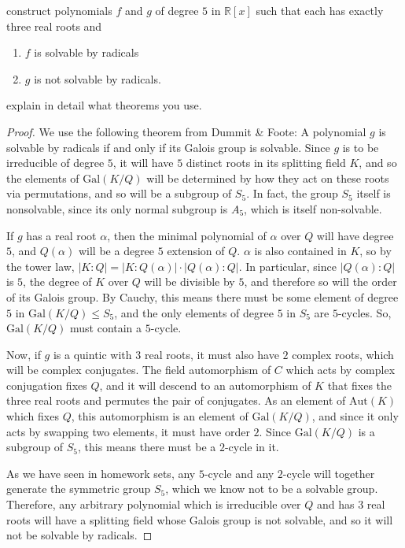 \documentclass[12pt]{article}
\newcommand{\R}{\mathbb{R}}
\theoremstyle{definition}
\newenvironment{problem}[2][Problem]{\begin{trivlist}
\item[\hskip \labelsep {\bfseries #1}\hskip \labelsep {\bfseries #2.}]}{\end{trivlist}}
\begin{document}
\begin{problem}{7}
	construct polynomials $f$ and $g$ of degree $5$ in $\R[x]$ such that each has exactly three real roots and
	\begin{enumerate}[label=(\alph*)]
		\item $f$ is solvable by radicals
		\item $g$ is not solvable by radicals.
	\end{enumerate}
	explain in detail what theorems you use.
	\begin{proof}
		We use the following theorem from Dummit \& Foote: A polynomial $g$ is solvable by radicals if and only if its Galois group is solvable. Since $g$ is to be irreducible of degree $5$, it will have $5$ distinct roots in its splitting field $K$, and so the elements of $\text{Gal}(K/Q)$ will be determined by how they act on these roots via permutations, and so will be a subgroup of $S_5$. In fact, the group $S_5$ itself is nonsolvable, since its only normal subgroup is $A_5$, which is itself non-solvable.
		\par If $g$ has a real root $\alpha$, then the minimal polynomial of $\alpha$ over $Q$ will have degree $5$, and $Q(\alpha)$ will be a degree $5$ extension of $Q$. $\alpha$ is also contained in $K$, so by the tower law, $ \left \lvert { K : Q } \right \lvert = \left \lvert { K : Q(\alpha) } \right \lvert \cdot \left \lvert { Q(\alpha) : Q } \right \lvert $. In particular, since $\left \lvert { Q(\alpha) : Q } \right \lvert $ is $5$, the degree of $K$ over $Q$ will be divisible by $5$, and therefore so will the order of its Galois group. By Cauchy, this means there must be some element of degree $5$ in $\text{Gal}(K/Q) \leq S_5$, and the only elements of degree $5$ in $S_5$ are $5$-cycles. So, $\text{Gal}(K/Q)$ must contain a $5$-cycle.
		\par Now, if $g$ is a quintic with $3$ real roots, it must also have $2$ complex roots, which will be complex conjugates. The field automorphism of $C$ which acts by complex conjugation fixes $Q$, and it will descend to an automorphism of $K$ that fixes the three real roots and permutes the pair of conjugates. As an element of $\text{Aut}(K)$ which fixes $Q$, this automorphism is an element of $\text{Gal}(K/Q)$, and since it only acts by swapping two elements, it must have order $2$. Since $\text{Gal}(K/Q)$ is a subgroup of $S_5$, this means there must be a $2$-cycle in it.
		\par As we have seen in homework sets, any $5$-cycle and any $2$-cycle will together generate the symmetric group $S_5$, which we know not to be a solvable group. Therefore, any arbitrary polynomial which is irreducible over $Q$ and has $3$ real roots will have a splitting field whose Galois group is not solvable, and so it will not be solvable by radicals.

\end{proof}
\end{problem}
\end{document}
